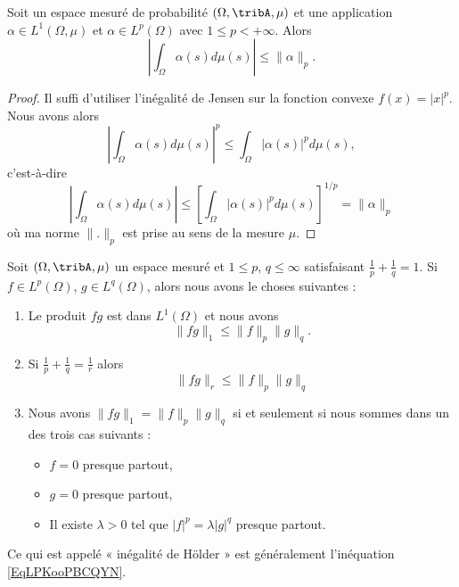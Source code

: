 \begin{corollary}
	Soit un espace mesuré de probabilité \( (\Omega,\tribA,\mu)\) et une application \( \alpha\in L^1(\Omega,\mu)\) et \( \alpha\in L^p(\Omega)\) avec \( 1\leq p<+\infty\). Alors
	\begin{equation}
		| \int_{\Omega}\alpha(s)d\mu(s) |\leq \| \alpha \|_p.
	\end{equation}
\end{corollary}

\begin{proof}
	Il suffi d'utiliser l'inégalité de Jensen sur la fonction convexe \( f(x)=| x |^p\). Nous avons alors
	\begin{equation}
		| \int_{\Omega}\alpha(s)d\mu(s) |^p\leq \int_{\Omega}| \alpha(s) |^pd\mu(s),
	\end{equation}
	c'est-à-dire
	\begin{equation}
		| \int_{\Omega}\alpha(s)d\mu(s) |\leq  \left[  \int_{\Omega}| \alpha(s) |^pd\mu(s)\right]^{1/p}=\| \alpha \|_p
	\end{equation}
	où ma norme \( \| . \|_p\) est prise au sens de la mesure \( \mu\).
\end{proof}

\begin{proposition}       \label{ProptYqspT}
	Soit \(  (\Omega,\tribA,\mu) \) un espace mesuré et \( 1\leq p\), \( q\leq\infty\) satisfaisant \( \frac{1}{ p }+\frac{1}{ q }=1\). Si \( f\in L^p(\Omega)\), \( g\in L^q(\Omega)\), alors nous avons le choses suivantes :

	\begin{enumerate}
		\item       \label{ITEMooNDKPooRKdmgS}
		      Le produit \( fg\) est dans \( L^1(\Omega)\) et nous avons
		      \begin{equation}    \label{EqLPKooPBCQYN}
			      \| fg \|_1\leq \| f \|_p\| g \|_q.
		      \end{equation}
		\item           \label{ITEMooQHLPooRWWMOP}
		      Si \( \frac{1}{ p }+\frac{1}{ q }=\frac{1}{ r }\) alors
		      \begin{equation}    \label{EqAVZooFNyzmT}
			      \| fg \|_r\leq \| f \|_p\| g \|_q
		      \end{equation}
		\item       \label{ITEMooBOYJooRkiAqJ}
		      Nous avons \( \| fg \|_1=\| f \|_p\| g \|_q\) si et seulement si nous sommes dans un des trois cas suivants :
		      \begin{itemize}
			      \item \( f=0\) presque partout,
			      \item \( g=0\) presque partout,
			      \item Il existe \( \lambda> 0\) tel que \( | f |^p=\lambda| g |^q\) presque partout.
		      \end{itemize}
	\end{enumerate}
\end{proposition}
Ce qui est appelé « inégalité de Hölder » est généralement l'inéquation \eqref{EqLPKooPBCQYN}.

